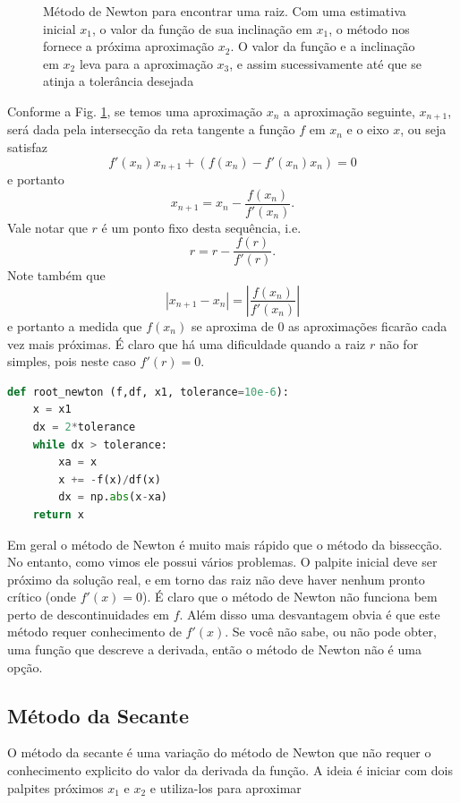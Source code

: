 \begin{figure}
\centering

\caption{Método de Newton para encontrar uma raiz. Com uma estimativa inicial $x_1$, o
valor da função de sua inclinação em $x_1$, o método nos fornece a próxima aproximação
$x_2$. O valor da função e a inclinação em $x_2$ leva para a aproximação $x_3$, e assim sucessivamente até que se atinja a tolerância desejada} \label{fig:Newton_method}
\end{figure}
Conforme a Fig. \ref{fig:Newton_method}, se temos uma aproximação $x_n$ a aproximação seguinte, $x_{n+1}$, será dada pela intersecção da reta tangente a função $f$ em $x_n$ e o eixo $x$, ou seja satisfaz
\[f'(x_n)x_{n+1}+(f(x_n)-f'(x_n)x_n) = 0 \]
e portanto
\[x_{n+1} = x_n - \frac{f(x_n)}{f'(x_n)}.\]
Vale notar que $r$ é um ponto fixo desta sequência, i.e. 
\[ r = r - \frac{f(r)}{f'(r)}.\]
Note também que 
\[\left| x_{n+1} - x_n \right| = \left|\frac{f(x_n)}{f'(x_n)}\right| \]
e portanto a medida que $f(x_n)$ se aproxima de 0 as aproximações ficarão cada vez mais próximas. É claro que há uma dificuldade quando a raiz $r$ não for simples, pois neste caso $f'(r)=0$. 

\begin{lstlisting}[language=Python, frame=lines,basicstyle=\footnotesize, caption={Método da Newton-Raphson para cálculo de raizes}, label={lst:met-newton}]
def root_newton (f,df, x1, tolerance=10e-6):
    x = x1
    dx = 2*tolerance 
    while dx > tolerance:
        xa = x
        x += -f(x)/df(x)
        dx = np.abs(x-xa)
    return x 
\end{lstlisting}

Em geral o método de Newton é muito mais rápido que o método da bissecção. No entanto, como vimos ele possui vários problemas. O palpite inicial deve ser próximo da solução real, e em torno das raiz não deve haver nenhum pronto crítico (onde $f'(x)=0$). É claro que o método de Newton não funciona bem perto de descontinuidades em $f$. Além disso uma desvantagem obvia é que este método requer conhecimento de $f'(x)$. Se você não sabe, ou não pode obter,
uma função que descreve a derivada, então o método de Newton não é uma opção.

\subsection{Método da Secante}

O método da secante é uma variação do método de Newton que não requer o conhecimento explicito do valor da derivada da função. A ideia é iniciar com dois palpites próximos $x_1$ e $x_2$ e utiliza-los para aproximar 

